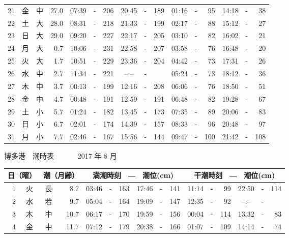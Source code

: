 \documentclass[12pt.a4j]{jsarticle}
\begin{document}
\begin{center}
\begin{table}[ht]
\begin{tabular}{|rc|cr|ccrccr|ccrccr|}
21 & 金 & 中 & 27.0 &  07:39 &-& 206  &  20:45 &-& 189  &   01:16 &-&  95  &   14:18 &-&  38  \\
22 & 土 & 大 & 28.0 &  08:31 &-& 218  &  21:33 &-& 199  &   02:17 &-&  88  &   15:12 &-&  27  \\
23 & 日 & 大 & 29.0 &  09:20 &-& 227  &  22:17 &-& 205  &   03:10 &-&  82  &   16:02 &-&  21  \\
24 & 月 & 大 &  0.7 &  10:06 &-& 231  &  22:58 &-& 207  &   03:58 &-&  76  &   16:48 &-&  20  \\
25 & 火 & 大 &  1.7 &  10:51 &-& 229  &  23:36 &-& 204  &   04:42 &-&  73  &   17:31 &-&  26  \\
26 & 水 & 中 &  2.7 &  11:34 &-& 221  &  --:-- &-&     &   05:24 &-&  73  &   18:12 &-&  36  \\
27 & 木 & 中 &  3.7 &  00:13 &-& 199  &  12:16 &-& 208  &   06:06 &-&  76  &   18:50 &-&  51  \\
28 & 金 & 中 &  4.7 &  00:48 &-& 191  &  12:59 &-& 191  &   06:48 &-&  82  &   19:28 &-&  67  \\
29 & 土 & 小 &  5.7 &  01:24 &-& 182  &  13:45 &-& 173  &   07:35 &-&  89  &   20:06 &-&  83  \\
30 & 日 & 小 &  6.7 &  02:01 &-& 174  &  14:39 &-& 157  &   08:33 &-&  96  &   20:48 &-&  97  \\
31 & 月 & 小 &  7.7 &  02:46 &-& 167  &  15:56 &-& 144  &   09:47 &-& 100  &   21:42 &-& 108  \\
   \hline
   \end{tabular}
\end{table}
\newpage
 {\LARGE 博多港　潮時表　　　}
 {\large 2017 年  8 月}\\
 \begin{table}[ht]
    \begin{tabular}{|rc|cr|ccrccr|ccrccr|}
    \hline
    \multicolumn{2}{|c|}{日（曜）} & \multicolumn{2}{c|}{潮（月齢）} & \multicolumn{6}{c|}{満潮時刻　―　潮位(cm)} & \multicolumn{6}{c|}{干潮時刻　―　潮位(cm)} \\
 \hline
 1 & 火 & 長 &  8.7 &  03:46 &-& 163  &  17:46 &-& 141  &   11:14 &-&  99  &   22:50 &-& 114  \\
 2 & 水 & 若 &  9.7 &  05:04 &-& 164  &  19:09 &-& 147  &   12:35 &-&  92  &   --:-- &-&     \\
 3 & 木 & 中 & 10.7 &  06:17 &-& 170  &  19:59 &-& 156  &   00:04 &-& 114  &   13:32 &-&  83  \\
 4 & 金 & 中 & 11.7 &  07:12 &-& 179  &  20:38 &-& 166  &   01:07 &-& 109  &   14:14 &-&  74  \\

\end{tabular}
\end{table}
\end{center}
\end{document}
